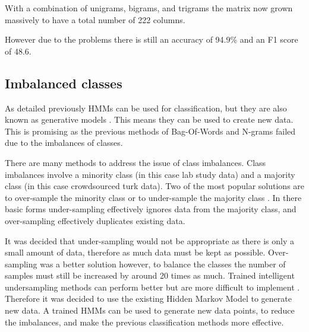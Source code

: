 \documentclass{article}
\begin{document}
With a combination of unigrams, bigrams, and trigrams the matrix now grown massively to have a total number of 222 columns.

However due to the problems there is still an accuracy of 94.9\% and an F1 score of 48.6.

\subsection{Imbalanced classes}




As detailed previously HMMs can be used for classification, but they are also known as generative models \cite{ferrando2018generating}.
This means they can be used to create new data.
This is promising as the previous methods of Bag-Of-Words and N-grams failed due to the imbalances of classes.

There are many methods to address the issue of class imbalances.
Class imbalances involve a minority class (in this case lab study data) and a majority class (in this case crowdsourced turk data).
Two of the most popular solutions are to over-sample the minority class or to under-sample the majority class \cite{chawla2002smote}.
In there basic forms under-sampling effectively ignores data from the majority class, and over-sampling effectively duplicates existing data.

It was decided that under-sampling would not be appropriate as there is only a small amount of data, therefore as much data must be kept as possible.
Over-sampling was a better solution however, to balance the classes the number of samples must still be increased by around 20 times as much. 
Trained intelligent undersampling methods can perform better but are more difficult to implement \cite{chawla2002smote}.
Therefore it was decided to use the existing Hidden Markov Model to generate new data.
A trained HMMs can be used to generate new data points, to reduce the imbalances, and make the previous classification methods more effective.
\end{document}
